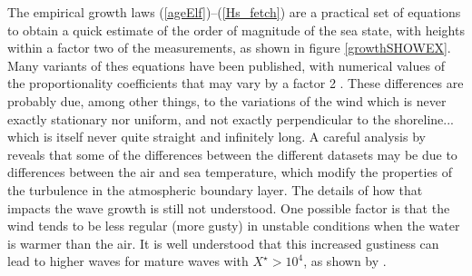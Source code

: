 The empirical growth laws (\ref{ageElf})--(\ref{Hs_fetch}) are a practical set of equations to 
obtain a quick estimate of the order of magnitude of the sea state, with heights within a factor two of the measurements, as shown in figure \ref{growthSHOWEX}.  
Many variants of thes equations have been published, with numerical values of the proportionality coefficients that may vary by a factor 2 \citep{Kahma&Calkoen1992}.
These differences are probably due, among other things, to the variations of the 
wind which is never exactly stationary nor uniform, and not exactly perpendicular to the shoreline... which is itself never quite straight and infinitely 
long. A careful analysis by \cite{Young1998} reveals that some of the differences between the different datasets may be due to differences between the air and sea 
temperature, which modify the properties of the turbulence in the atmospheric boundary layer. The details of how that impacts the wave growth is still 
not understood. One possible factor is that the wind tends to be less regular (more gusty) in unstable conditions when the water is warmer than the air. It is 
well understood that this increased gustiness can lead to higher waves for mature waves with $X^\star
> 10^4$, as shown by \cite{Abdalla&Cavaleri2002}. 
